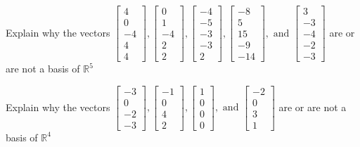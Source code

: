 \documentclass{article}
\begin{document}
\begin{exerciseStatement}
    Explain why the vectors \(\left[\begin{array}{r}
4 \\
0 \\
-4 \\
4 \\
4
\end{array}\right] , \left[\begin{array}{r}
0 \\
1 \\
-4 \\
2 \\
2
\end{array}\right] , \left[\begin{array}{r}
-4 \\
-5 \\
-3 \\
-3 \\
2
\end{array}\right] , \left[\begin{array}{r}
-8 \\
5 \\
15 \\
-9 \\
-14
\end{array}\right] , \text{ and } \left[\begin{array}{r}
3 \\
-3 \\
-4 \\
-2 \\
-3
\end{array}\right]\) are or are not a basis of \(\mathbb{R}^5\)


  
\end{exerciseStatement}

\begin{exerciseStatement}
    Explain why the vectors \(\left[\begin{array}{r}
-3 \\
0 \\
-2 \\
-3
\end{array}\right] , \left[\begin{array}{r}
-1 \\
0 \\
4 \\
2
\end{array}\right] , \left[\begin{array}{r}
1 \\
0 \\
0 \\
0
\end{array}\right] , \text{ and } \left[\begin{array}{r}
-2 \\
0 \\
3 \\
1
\end{array}\right]\) are or are not a basis of \(\mathbb{R}^4\)


  
\end{exerciseStatement}
\end{document}
